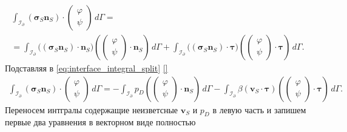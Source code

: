 \documentclass[a4paper,14pt]{extarticle}
\begin{document}
\begin{equation}
	\begin{gathered}
		\int_{\mathcal I_\partial}
		(\boldsymbol\sigma_S\mathbf n_S)\cdot
		\begin{pmatrix}
			\varphi\\
			\psi
		\end{pmatrix}
		\,d\Gamma
		=
		\\[6pt]
		=
		\int_{\mathcal I_\partial}
		\bigl(
			(\boldsymbol\sigma_S\mathbf n_S)
			\cdot\mathbf n_S
		\bigr)
		\left(
			\begin{pmatrix}
				\varphi\\
				\psi
			\end{pmatrix}
			\cdot\mathbf n_S
		\right)
		\,d\Gamma
		+
		\int_{\mathcal I_\partial}
		\bigl(
			(\boldsymbol\sigma_S\mathbf n_S)
			\cdot\boldsymbol\tau
		\bigr)
		\left(
			\begin{pmatrix}
				\varphi\\
				\psi
			\end{pmatrix}
			\cdot\boldsymbol\tau
		\right)
		\,d\Gamma.
	\end{gathered}
	\label{eq:interface_integral_split}
\end{equation}
Подставляя в \eqref{eq:interface_integral_split} \eqref{}
\begin{equation}
	\begin{gathered}
		\int_{\mathcal I_\partial}
		(\boldsymbol\sigma_S\mathbf n_S)\cdot
		\begin{pmatrix}
			\varphi\\
			\psi
		\end{pmatrix}
		\,d\Gamma
		=
		-
		\int_{\mathcal I_\partial}
		p_D
		\left(
			\begin{pmatrix}
				\varphi\\
				\psi
			\end{pmatrix}
			\cdot\mathbf n_S
		\right)
		\,d\Gamma
		-
		\int_{\mathcal I_\partial}
		\beta
		(\mathbf v_S\cdot\boldsymbol\tau)
		\left(
			\begin{pmatrix}
				\varphi\\
				\psi
			\end{pmatrix}
			\cdot\boldsymbol\tau
		\right)
		\,d\Gamma.
	\end{gathered}
	\label{eq:interface_integral_result}
\end{equation}
Переносем интгралы содержащие неизветсные $\mathbf v_S$ и $p_D$ в левую часть и запишем первые два уравнения в векторном виде полностью
\end{document}
